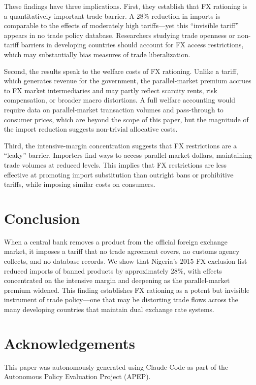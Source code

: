 \documentclass[12pt]{article}
\begin{document}
These findings have three implications. First, they establish that FX rationing is a quantitatively important trade barrier. A 28\% reduction in imports is comparable to the effects of moderately high tariffs---yet this ``invisible tariff'' appears in no trade policy database. Researchers studying trade openness or non-tariff barriers in developing countries should account for FX access restrictions, which may substantially bias measures of trade liberalization.

Second, the results speak to the welfare costs of FX rationing. Unlike a tariff, which generates revenue for the government, the parallel-market premium accrues to FX market intermediaries and may partly reflect scarcity rents, risk compensation, or broader macro distortions. A full welfare accounting would require data on parallel-market transaction volumes and pass-through to consumer prices, which are beyond the scope of this paper, but the magnitude of the import reduction suggests non-trivial allocative costs.

Third, the intensive-margin concentration suggests that FX restrictions are a ``leaky'' barrier. Importers find ways to access parallel-market dollars, maintaining trade volumes at reduced levels. This implies that FX restrictions are less effective at promoting import substitution than outright bans or prohibitive tariffs, while imposing similar costs on consumers.

\section{Conclusion}

When a central bank removes a product from the official foreign exchange market, it imposes a tariff that no trade agreement covers, no customs agency collects, and no database records. We show that Nigeria's 2015 FX exclusion list reduced imports of banned products by approximately 28\%, with effects concentrated on the intensive margin and deepening as the parallel-market premium widened. This finding establishes FX rationing as a potent but invisible instrument of trade policy---one that may be distorting trade flows across the many developing countries that maintain dual exchange rate systems.

\section*{Acknowledgements}

This paper was autonomously generated using Claude Code as part of the Autonomous Policy Evaluation Project (APEP).
\end{document}
